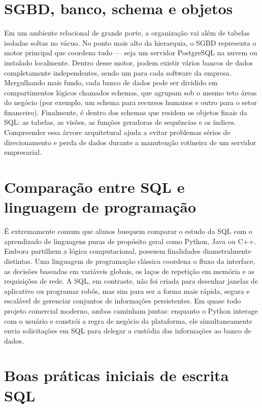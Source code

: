\section{SGBD, banco, schema e objetos}

Em um ambiente relacional de grande porte, a organização vai além de tabelas isoladas soltas no vácuo. No ponto mais alto da hierarquia, o SGBD representa o motor principal que coordena tudo — seja um servidor PostgreSQL na nuvem ou instalado localmente. Dentro desse motor, podem existir vários bancos de dados completamente independentes, sendo um para cada software da empresa. Mergulhando mais fundo, cada banco de dados pode ser dividido em compartimentos lógicos chamados schemas, que agrupam sob o mesmo teto áreas do negócio (por exemplo, um schema para recursos humanos e outro para o setor financeiro). Finalmente, é dentro dos schemas que residem os objetos finais da SQL: as tabelas, as visões, as funções geradoras de sequências e os índices. Compreender essa árvore arquitetural ajuda a evitar problemas sérios de direcionamento e perda de dados durante a manutenção rotineira de um servidor empresarial.

\section{Comparação entre SQL e linguagem de programação}

É extremamente comum que alunos busquem comparar o estudo da SQL com o aprendizado de linguagens puras de propósito geral como Python, Java ou C++. Embora partilhem a lógica computacional, possuem finalidades diametralmente distintas. Uma linguagem de programação clássica coordena o fluxo da interface, as decisões baseadas em variáveis globais, os laços de repetição em memória e as requisições de rede. A SQL, em contraste, não foi criada para desenhar janelas de aplicativo ou programar robôs, mas sim para ser a forma mais rápida, segura e escalável de gerenciar conjuntos de informações persistentes. Em quase todo projeto comercial moderno, ambas caminham juntas: enquanto o Python interage com o usuário e constrói a regra de negócio da plataforma, ele simultaneamente envia solicitações em SQL para delegar a custódia das informações ao banco de dados.

\section{Boas práticas iniciais de escrita SQL}

